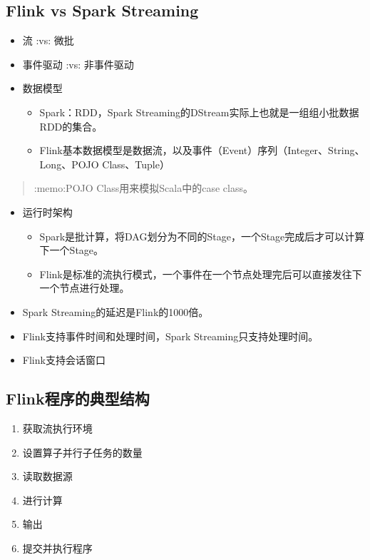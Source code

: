 \hypertarget{flink-vs-spark-streaming}{%
\subsection{Flink vs Spark Streaming}\label{flink-vs-spark-streaming}}

\begin{itemize}
\tightlist
\item
  流 :vs: 微批
\item
  事件驱动 :vs: 非事件驱动
\item
  数据模型

  \begin{itemize}
  \tightlist
  \item
    Spark：RDD，Spark
    Streaming的DStream实际上也就是一组组小批数据RDD的集合。
  \item
    Flink基本数据模型是数据流，以及事件（Event）序列（Integer、String、Long、POJO
    Class、Tuple）
  \end{itemize}
\end{itemize}

\begin{quote}
:memo:POJO Class用来模拟Scala中的case class。
\end{quote}

\begin{itemize}
\tightlist
\item
  运行时架构

  \begin{itemize}
  \tightlist
  \item
    Spark是批计算，将DAG划分为不同的Stage，一个Stage完成后才可以计算下一个Stage。
  \item
    Flink是标准的流执行模式，一个事件在一个节点处理完后可以直接发往下一个节点进行处理。
  \end{itemize}
\item
  Spark Streaming的延迟是Flink的1000倍。
\item
  Flink支持事件时间和处理时间，Spark Streaming只支持处理时间。
\item
  Flink支持会话窗口
\end{itemize}

\hypertarget{flinkux7a0bux5e8fux7684ux5178ux578bux7ed3ux6784}{%
\subsection{Flink程序的典型结构}\label{flinkux7a0bux5e8fux7684ux5178ux578bux7ed3ux6784}}

\begin{enumerate}
\def\labelenumi{\arabic{enumi}.}
\tightlist
\item
  获取流执行环境
\item
  设置算子并行子任务的数量
\item
  读取数据源
\item
  进行计算
\item
  输出
\item
  提交并执行程序
\end{enumerate}

